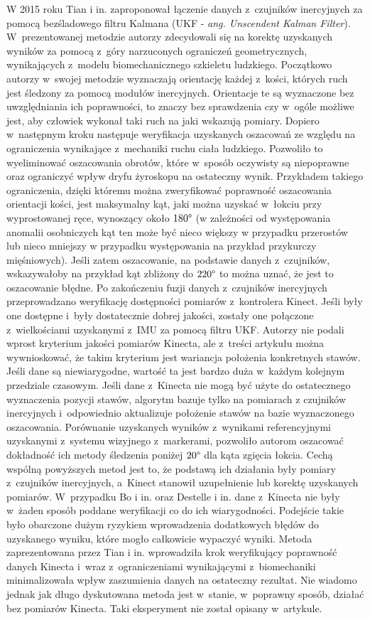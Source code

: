 W 2015 roku Tian i in. \cite{Tian2015a} zaproponował łączenie danych z~czujników inercyjnych za pomocą bezśladowego filtru Kalmana (UKF - \emph{ang. Unscendent Kalman Filter}). W~prezentowanej metodzie autorzy zdecydowali się na korektę uzyskanych wyników za pomocą z~góry narzuconych ograniczeń geometrycznych, wynikających z~modelu biomechanicznego szkieletu ludzkiego. Początkowo autorzy w~swojej metodzie wyznaczają orientację każdej z~kości, których ruch jest śledzony za pomocą modułów inercyjnych. Orientacje te są wyznaczone bez uwzględniania ich poprawności, to znaczy bez sprawdzenia czy w~ogóle możliwe jest, aby człowiek wykonał taki ruch na jaki wskazują pomiary. Dopiero w~następnym kroku następuje weryfikacja uzyskanych oszacowań ze względu na ograniczenia wynikające z~mechaniki ruchu ciała ludzkiego. Pozwoliło to wyeliminować oszacowania obrotów, które w~sposób oczywisty są niepoprawne oraz ograniczyć wpływ dryfu żyroskopu na ostateczny wynik. Przykładem takiego ograniczenia, dzięki któremu można zweryfikować poprawność oszacowania orientacji kości, jest maksymalny kąt, jaki można uzyskać w~łokciu przy wyprostowanej ręce, wynoszący około $180\degree$ (w zależności od występowania anomalii osobniczych kąt ten może być nieco większy w przypadku przerostów lub nieco mniejszy w przypadku występowania na przykład przykurczy mięśniowych). Jeśli zatem oszacowanie, na podstawie danych z~czujników, wskazywałoby na przykład kąt zbliżony do $220\degree$ to można uznać, że jest to oszacowanie błędne. Po zakończeniu fuzji danych z~czujników inercyjnych przeprowadzano weryfikację dostępności pomiarów z~kontrolera Kinect. Jeśli były one dostępne i~były dostatecznie dobrej jakości, zostały one połączone z~wielkościami uzyskanymi z~IMU za pomocą filtru UKF. Autorzy nie podali wprost kryterium jakości pomiarów Kinecta, ale z~treści artykułu można wywnioskować, że takim kryterium jest wariancja położenia konkretnych stawów. Jeśli dane są niewiarygodne, wartość ta jest bardzo duża w~każdym kolejnym przedziale czasowym. Jeśli dane z~Kinecta nie mogą być użyte do ostatecznego wyznaczenia pozycji stawów, algorytm bazuje tylko na pomiarach z czujników inercyjnych i~odpowiednio aktualizuje położenie stawów na bazie wyznaczonego oszacowania. Porównanie uzyskanych wyników z~wynikami referencyjnymi uzyskanymi z~systemu wizyjnego z~markerami, pozwoliło autorom oszacować dokładność ich metody śledzenia poniżej $20\degree$ dla kąta zgięcia łokcia.																																																	
Cechą wspólną powyższych metod jest to, że podstawą ich działania były pomiary z~czujników inercyjnych, a~Kinect stanowił uzupełnienie lub korektę uzyskanych pomiarów. W~przypadku Bo i in. oraz Destelle i in. dane z~Kinecta nie były w~żaden sposób poddane weryfikacji co do ich wiarygodności. Podejście takie było obarczone dużym ryzykiem wprowadzenia dodatkowych błędów do uzyskanego wyniku, które mogło całkowicie wypaczyć wyniki. Metoda zaprezentowana przez Tian i in. wprowadziła krok weryfikujący poprawność danych Kinecta i~wraz z~ograniczeniami wynikającymi z~biomechaniki minimalizowała wpływ zaszumienia danych na ostateczny rezultat. Nie wiadomo jednak jak długo dyskutowana metoda jest w~stanie, w~poprawny sposób, działać bez pomiarów Kinecta. Taki eksperyment nie został opisany w~artykule.																																																	
